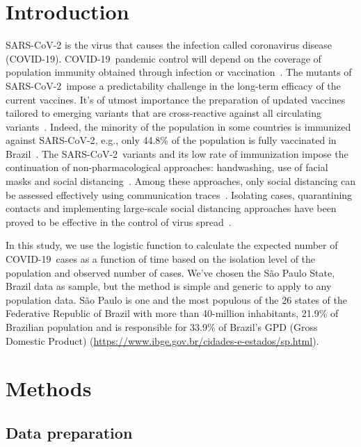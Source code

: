 \documentclass[review,3p,times]{elsarticle}
\def\covid{\hbox{COVID-19}} %
\def\sarscov{{SARS-CoV-2}}
\begin{document}

\section{Introduction}
\label{intro}

SARS-CoV-2 is the virus that causes the infection 
called coronavirus disease (\covid). 
\covid\ pandemic control will depend 
on the coverage of population immunity obtained 
through infection or vaccination~\cite{WHOa}. 
The mutants of \sarscov\ impose a 
predictability challenge in the long-term efficacy 
of the current vaccines. 
 It's of utmost importance the preparation of updated 
 vaccines tailored to emerging variants that are cross-reactive 
 against all circulating variants~\cite{Harvey2021}. 
Indeed, the minority of the population in some countries 
is immunized against \sarscov, 
e.g., only 44.8\% of the population  
is fully vaccinated in Brazil~\cite{MH2021}.
The \sarscov\ variants and its low rate of immunization 
impose the continuation of non-pharmacological approaches: 
handwashing, use of facial masks and social distancing~\cite{WHOb}. 
Among these approaches, only social distancing 
can be assessed effectively using 
communication traces~\cite{Farrahi2014}. 
 Isolating cases, quarantining contacts and implementing
large-scale social distancing approaches have been proved to 
be effective in the control of virus spread~\cite{Aquino2020}.

In this study, we use the logistic function 
to calculate the expected number of \covid\ cases 
as a function of time
based 
on the isolation level of the population and 
observed number of cases. 
We've chosen the S\~{a}o Paulo State, Brazil data as sample, 
but the method is simple and generic 
to apply to any population data. 
S\~{a}o Paulo is one and the most populous of the 26 states 
of the Federative Republic of Brazil with 
more than 40-million inhabitants, 21.9\% 
of Brazilian population and is responsible for 33.9\% 
of Brazil's GPD (Gross Domestic Product) 
(\url{https://www.ibge.gov.br/cidades-e-estados/sp.html}).

\section{Methods}
\label{methods}

\subsection{Data preparation}
\end{document}
